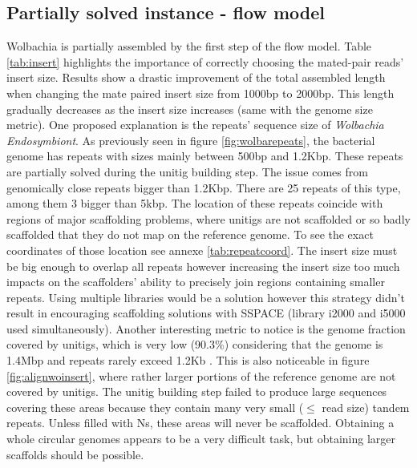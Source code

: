 \documentclass[12pt]{article}
\begin{document}
\subsection{Partially solved instance - flow model}\label{sec:wolbachia}
Wolbachia is partially assembled by the first step of the flow model. Table \ref{tab:insert} highlights the importance of correctly choosing the mated-pair reads' insert size. Results show a drastic improvement of the total assembled length when changing the mate paired insert size from 1000bp to 2000bp. This length gradually decreases as the insert size increases (same with the genome size metric). One proposed explanation is the repeats' sequence size of \textit{Wolbachia Endosymbiont}. As previously seen in figure \ref{fig:wolbarepeats}, the bacterial genome has repeats with sizes mainly between 500bp and 1.2Kbp. These repeats are partially solved during the unitig building step. The issue comes from genomically close repeats bigger than 1.2Kbp. There are 25 repeats of this type, among them 3 bigger than 5kbp. The location of these repeats coincide with regions of major scaffolding problems, where unitigs are not scaffolded or so badly scaffolded that they do not map on the reference genome. To see the exact coordinates of those location see annexe \ref{tab:repeatcoord}. The insert size must be big enough to overlap all repeats however increasing the insert size too much impacts on the scaffolders' ability to precisely join regions containing smaller repeats. Using multiple libraries would be a solution however this strategy didn't result in encouraging scaffolding solutions with SSPACE (library i2000 and i5000 used simultaneously). Another interesting metric to notice is the genome fraction covered by unitigs, which is very low (90.3\%) considering that the genome is 1.4Mbp and repeats rarely exceed 1.2Kb . This is also noticeable in figure \ref{fig:alignwoinsert}, where rather larger portions of the reference genome are not covered by unitigs. The unitig building step failed to produce large sequences covering these areas because they contain many very small ($\leq$ read size) tandem repeats. Unless filled with Ns, these areas will never be scaffolded. Obtaining a whole circular genomes appears to be a very difficult task, but obtaining larger scaffolds should be possible.
\end{document}
